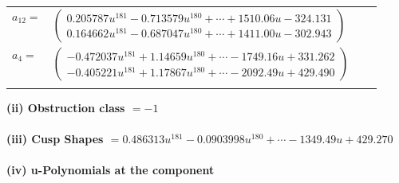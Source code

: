 \documentclass[1p]{elsarticle_modified}
\theoremstyle{definition}
\begin{document}
\begin{tabular}{m{7pt} m{180pt} m{7pt} m{180pt} }
\flushright $a_{12}=$&$\begin{pmatrix}0.205787 u^{181}-0.713579 u^{180}+\cdots+1510.06 u-324.131\\0.164662 u^{181}-0.687047 u^{180}+\cdots+1411.00 u-302.943\end{pmatrix}$ \\
\flushright $a_{4}=$&$\begin{pmatrix}-0.472037 u^{181}+1.14659 u^{180}+\cdots-1749.16 u+331.262\\-0.405221 u^{181}+1.17867 u^{180}+\cdots-2092.49 u+429.490\end{pmatrix}$\\&\end{tabular}
\flushleft \textbf{(ii) Obstruction class $= -1$}\\~\\
\flushleft \textbf{(iii) Cusp Shapes $= 0.486313 u^{181}-0.0903998 u^{180}+\cdots-1349.49 u+429.270$}\\~\\
\newpage\renewcommand{\arraystretch}{1}
\flushleft \textbf{(iv) u-Polynomials at the component}\newline \\
\end{document}

